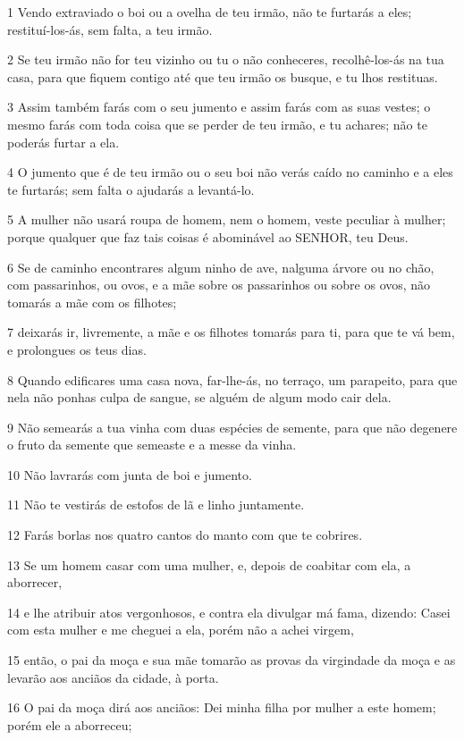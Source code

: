 \par 1 Vendo extraviado o boi ou a ovelha de teu irmão, não te furtarás a eles; restituí-los-ás, sem falta, a teu irmão.
\par 2 Se teu irmão não for teu vizinho ou tu o não conheceres, recolhê-los-ás na tua casa, para que fiquem contigo até que teu irmão os busque, e tu lhos restituas.
\par 3 Assim também farás com o seu jumento e assim farás com as suas vestes; o mesmo farás com toda coisa que se perder de teu irmão, e tu achares; não te poderás furtar a ela.
\par 4 O jumento que é de teu irmão ou o seu boi não verás caído no caminho e a eles te furtarás; sem falta o ajudarás a levantá-lo.
\par 5 A mulher não usará roupa de homem, nem o homem, veste peculiar à mulher; porque qualquer que faz tais coisas é abominável ao SENHOR, teu Deus.
\par 6 Se de caminho encontrares algum ninho de ave, nalguma árvore ou no chão, com passarinhos, ou ovos, e a mãe sobre os passarinhos ou sobre os ovos, não tomarás a mãe com os filhotes;
\par 7 deixarás ir, livremente, a mãe e os filhotes tomarás para ti, para que te vá bem, e prolongues os teus dias.
\par 8 Quando edificares uma casa nova, far-lhe-ás, no terraço, um parapeito, para que nela não ponhas culpa de sangue, se alguém de algum modo cair dela.
\par 9 Não semearás a tua vinha com duas espécies de semente, para que não degenere o fruto da semente que semeaste e a messe da vinha.
\par 10 Não lavrarás com junta de boi e jumento.
\par 11 Não te vestirás de estofos de lã e linho juntamente.
\par 12 Farás borlas nos quatro cantos do manto com que te cobrires.
\par 13 Se um homem casar com uma mulher, e, depois de coabitar com ela, a aborrecer,
\par 14 e lhe atribuir atos vergonhosos, e contra ela divulgar má fama, dizendo: Casei com esta mulher e me cheguei a ela, porém não a achei virgem,
\par 15 então, o pai da moça e sua mãe tomarão as provas da virgindade da moça e as levarão aos anciãos da cidade, à porta.
\par 16 O pai da moça dirá aos anciãos: Dei minha filha por mulher a este homem; porém ele a aborreceu;
